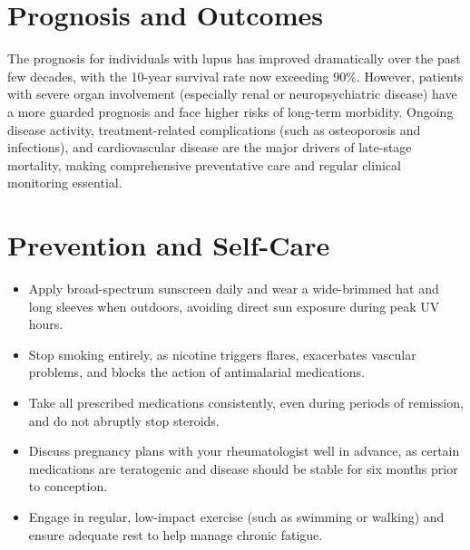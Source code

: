 \section*{Prognosis and Outcomes}
The prognosis for individuals with lupus has improved dramatically over the past few decades, with the 10-year survival rate now exceeding 90\%. However, patients with severe organ involvement (especially renal or neuropsychiatric disease) have a more guarded prognosis and face higher risks of long-term morbidity. Ongoing disease activity, treatment-related complications (such as osteoporosis and infections), and cardiovascular disease are the major drivers of late-stage mortality, making comprehensive preventative care and regular clinical monitoring essential.

\section*{Prevention and Self-Care}
\begin{itemize}
    \item Apply broad-spectrum sunscreen daily and wear a wide-brimmed hat and long sleeves when outdoors, avoiding direct sun exposure during peak UV hours.
    \item Stop smoking entirely, as nicotine triggers flares, exacerbates vascular problems, and blocks the action of antimalarial medications.
    \item Take all prescribed medications consistently, even during periods of remission, and do not abruptly stop steroids.
    \item Discuss pregnancy plans with your rheumatologist well in advance, as certain medications are teratogenic and disease should be stable for six months prior to conception.
    \item Engage in regular, low-impact exercise (such as swimming or walking) and ensure adequate rest to help manage chronic fatigue.
\end{itemize}

